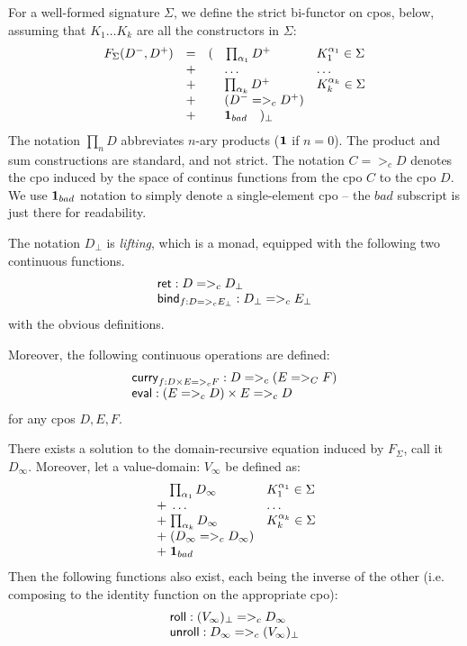 \documentclass[preprint,nocopyrightspace,draft]{sigplanconf}
\begin{document}
For a well-formed signature $\Sigma$, we define the strict bi-functor on cpos, below, 
assuming that $K_1\ldots K_k$ are all the constructors in $\Sigma$: 
\[\begin{array}{lclll}
  F_{\Sigma}(D^{-},D^{+}) & = & ( \quad{\prod_{\alpha_1}{D^{+}}} & K_1^{\alpha_1} \in \Sigma \\
                      & + & \;\quad\ldots                    & \ldots \\
                      & + & \;\quad{\prod_{\alpha_k}{D^{+}}} & K_k^{\alpha_k} \in \Sigma \\ 
                      & + & \;\quad(D^{-} =>_c D^{+}) \\
                      & + & \;\quad{\sf{\bf 1}}_{bad} \quad )_{\bot}
\end{array}\] 
The notation $\prod_{n}{D}$ abbreviates $n$-ary products (${\sf{\bf 1}}$ if $n = 0$). The product
and sum constructions are standard, and not strict. The notation $C =>_c D$ denotes the cpo 
induced by the space of continus functions from the cpo $C$ to the cpo $D$. We use ${\sf{\bf 1}}_{bad}$ 
notation to simply denote a single-element cpo -- the $bad$ subscript is just there for readability. 

The notation $D_\bot$ is {\em lifting}, which is a monad, equipped with the following two continuous functions.
\[\begin{array}{l}
   \mathsf{ret}   : D =>_c D_\bot \\ 
   \mathsf{bind}_{f : D =>_c E_\bot} : D_\bot =>_c E_\bot
\end{array}\]
with the obvious definitions.

Moreover, the following continuous operations are defined:
\[\begin{array}{l} 
   \mathsf{curry}_{f : D\times E =>_c F} : D =>_c (E =>_C F) \\ 
   \mathsf{eval} : (E =>_c D)\times E =>_c D 
\end{array}\] 
for any cpos $D, E, F$.

\begin{lemma}\label{lem:rec-solution} 
There exists a solution to the domain-recursive equation induced by $F_{\Sigma}$, call it $D_{\infty}$.
Moreover, let a value-domain: $V_{\infty}$ be defined as:
    \[\begin{array}{ll}
             \quad\;{\prod_{\alpha_1}{D_{\infty}}} & K_1^{\alpha_1} \in \Sigma \\
             \; + \;\ldots                    & \ldots \\
             \; + \;{\prod_{\alpha_k}{D_{\infty}}} & K_k^{\alpha_k} \in \Sigma \\ 
             \; + \;(D_{\infty} =>_c D_{\infty}) \\
             \; + \;{\sf{\bf 1}}_{bad} \quad
    \end{array}\]
Then the following functions also exist, each being the inverse of the other (i.e. composing to the identity 
function on the appropriate cpo):
\[\begin{array}{l}
  \mathsf{roll} : (V_{\infty})_\bot =>_c D_{\infty} \\ 
  \mathsf{unroll} : D_{\infty} =>_c (V_{\infty})_\bot
\end{array}\] 
\end{lemma}
\end{document}
